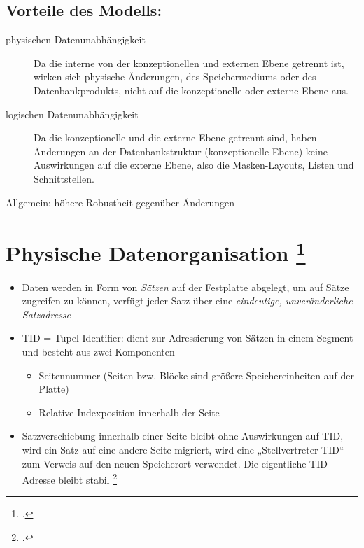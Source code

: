 \documentclass{lehramt-informatik-haupt}
\begin{document}
\subsection{Vorteile des Modells:}

\begin{description}
\item[physischen Datenunabhängigkeit]

Da die interne von der konzeptionellen und externen Ebene getrennt ist,
wirken sich physische Änderungen, \zB des Speichermediums oder des
Datenbankprodukts, nicht auf die konzeptionelle oder externe Ebene aus.

\item[logischen Datenunabhängigkeit]

Da die konzeptionelle und die externe Ebene getrennt sind, haben
Änderungen an der Datenbankstruktur (konzeptionelle Ebene) keine
Auswirkungen auf die externe Ebene, also die Masken-Layouts, Listen und
Schnittstellen.
\end{description}

Allgemein: höhere Robustheit gegenüber Änderungen

%

\section{Physische Datenorganisation
\footcite[Seite 21]{db:fs:3}}

\begin{itemize}
\item Daten werden in Form von \emph{Sätzen} auf der Festplatte
abgelegt, um auf Sätze zugreifen zu können, verfügt jeder Satz über eine
\emph{eindeutige, unveränderliche Satzadresse}

\item TID = Tupel Identifier: dient zur Adressierung von Sätzen in einem
Segment und besteht aus zwei Komponenten

\begin{itemize}
\item Seitennummer (Seiten bzw. Blöcke sind größere Speichereinheiten
auf der Platte)

\item Relative Indexposition innerhalb der Seite
\end{itemize}

\item Satzverschiebung innerhalb einer Seite bleibt ohne Auswirkungen
auf TID, wird ein Satz auf eine andere Seite migriert, wird eine
„Stellvertreter-TID“ zum Verweis auf den neuen Speicherort verwendet.
Die eigentliche TID-Adresse bleibt stabil
\footcite[Seite 219]{kemper}
\end{itemize}

\literatur
\end{document}
